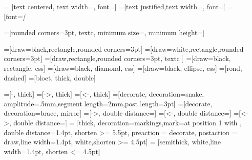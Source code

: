 
\usetikzlibrary{trees}
\usetikzlibrary{automata}
\usetikzlibrary{positioning}
\usetikzlibrary{petri}
\usetikzlibrary{arrows}
\usetikzlibrary{calc}
\usetikzlibrary{decorations.pathreplacing}
\usetikzlibrary{decorations.markings}
\usetikzlibrary{backgrounds}
\usetikzlibrary{fit}
\usetikzlibrary{snakes}
\usetikzlibrary{matrix}
\usetikzlibrary{shapes.geometric}
\usetikzlibrary{shapes.symbols}


\newcommand{\scale}{1}
\newcommand{\mfont}{\large}
\newlength{\unit} \setlength{\unit}{\scale cm} 
\newlength{\lbloc} \setlength{\lbloc}{2cm} \newlength{\hbloc} \setlength{\hbloc}{1cm} %
\newlength{\ebloc} \setlength{\ebloc}{3cm} %
\newlength{\ltext} \setlength{\ltext}{2 cm} %
\beamer{\newcommand{\ymove}{2.5*\unit}} {\newcommand{\ymove}{2.5cm}}

=  [text centered, text width=\ltext, font=\mfont] %
=[text justified,text width=\ltext, font=\mfont] 
=[font=\itshape\small] 

=[rounded corners=3pt, textc, minimum size=\lbloc, minimum height=\hbloc] %

=[draw=black,rectangle,rounded corners=3pt]
=[draw=white,rectangle,rounded corners=3pt]
=[draw,rectangle,rounded corners=3pt, textc ]
=[draw=black, rectangle, css]
=[draw=black, diamond, css]
=[draw=black, ellipse, css]	
=[rond, dashed]	
=[bloct, thick, double] 

\newlength{\dline} \setlength{\dline}{2pt} %

=[-, thick]
=[->, thick]
=[<-, thick]
=[decorate, decoration={snake, amplitude=.5mm,segment length=2mm,post length=3pt}]
=[decorate, decoration={brace, mirror}]
=[->, double distance=\dline]
=[<-, double distance=\dline]
=[<->, double distance=\dline]
 = [thick, decoration={markings,mark=at position
   1 with {}},
   double distance=1.4pt, shorten >= 5.5pt,
   preaction = {decorate},
   postaction = {draw,line width=1.4pt, white,shorten >= 4.5pt}]
 = [semithick, white,line width=1.4pt, shorten <= 4.5pt]

\newcommand{\antensize}{0.4}
\newcommand{\antena}[1]
{\draw  (#1) -- ++(50:\antensize)
        (#1) -- ++(90:\antensize)
        (#1) -- ++(130:\antensize);
}

